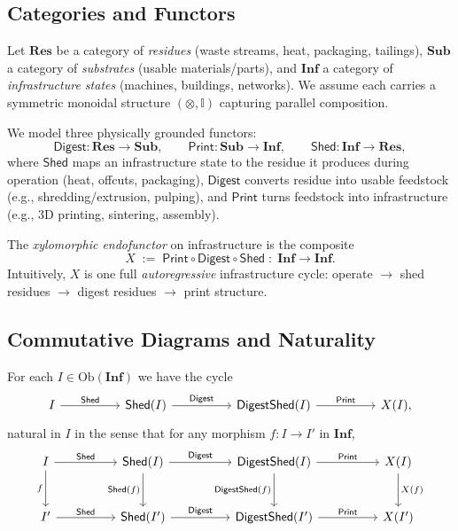 \documentclass[12pt]{article}
\theoremstyle{plain}
\begin{document}
{{{{{{{{{{{{{{{{\subsection{Categories and Functors}

Let $\mathbf{Res}$ be a category of \emph{residues} (waste streams, heat, packaging, tailings), $\mathbf{Sub}$ a category of \emph{substrates} (usable materials/parts), and $\mathbf{Inf}$ a category of \emph{infrastructure states} (machines, buildings, networks). We assume each carries a symmetric monoidal structure $(\otimes,\mathbb{I})$ capturing parallel composition.

We model three physically grounded functors:
\[
\mathsf{Digest}:\mathbf{Res}\to\mathbf{Sub},\qquad
\mathsf{Print}:\mathbf{Sub}\to\mathbf{Inf},\qquad
\mathsf{Shed}:\mathbf{Inf}\to\mathbf{Res},
\]
where $\mathsf{Shed}$ maps an infrastructure state to the residue it produces during operation (heat, offcuts, packaging), $\mathsf{Digest}$ converts residue into usable feedstock (e.g., shredding/extrusion, pulping), and $\mathsf{Print}$ turns feedstock into infrastructure (e.g., 3D printing, sintering, assembly).

\begin{definition}
The \emph{xylomorphic endofunctor} on infrastructure is the composite
\[
X \;:=\; \mathsf{Print}\circ \mathsf{Digest}\circ \mathsf{Shed}\;:\;\mathbf{Inf}\to\mathbf{Inf}.
\]
Intuitively, $X$ is one full \emph{autoregressive} infrastructure cycle: operate $\to$ shed residues $\to$ digest residues $\to$ print structure.
\end{definition}

\subsection{Commutative Diagrams and Naturality}

For each $I\in\mathrm{Ob}(\mathbf{Inf})$ we have the cycle
\[
\begin{tikzcd}[column sep=huge,row sep=large]
I \arrow[r, "\mathsf{Shed}"] &
\mathsf{Shed}(I) \arrow[r, "\mathsf{Digest}"] &
\mathsf{Digest}\mathsf{Shed}(I) \arrow[r, "\mathsf{Print}"] &
X(I),
\end{tikzcd}
\]
natural in $I$ in the sense that for any morphism $f:I\to I'$ in $\mathbf{Inf}$,
\[
\begin{tikzcd}[column sep=huge,row sep=large]
I \arrow[d,"f"'] \arrow[r,"\mathsf{Shed}"] &
\mathsf{Shed}(I) \arrow[d,"\mathsf{Shed}(f)"'] \arrow[r,"\mathsf{Digest}"] &
\mathsf{Digest}\mathsf{Shed}(I) \arrow[d,"\mathsf{Digest}\mathsf{Shed}(f)"'] \arrow[r,"\mathsf{Print}"] &
X(I) \arrow[d,"X(f)"] \\
I' \arrow[r,"\mathsf{Shed}"] &
\mathsf{Shed}(I') \arrow[r,"\mathsf{Digest}"] &
\mathsf{Digest}\mathsf{Shed}(I') \arrow[r,"\mathsf{Print}"] &
X(I')
\end{tikzcd}
\]

}}}}}}}}}}}}}}}}
\end{document}
